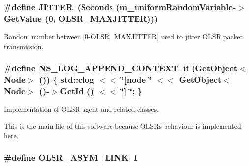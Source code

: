 \subsubsection[{\texorpdfstring{J\+I\+T\+T\+ER}{JITTER}}]{\setlength{\rightskip}{0pt plus 5cm}\#define J\+I\+T\+T\+ER~(Seconds (m\+\_\+uniform\+Random\+Variable-\/$>$Get\+Value (0, {\bf O\+L\+S\+R\+\_\+\+M\+A\+X\+J\+I\+T\+T\+ER})))}\hypertarget{olsr-routing-protocol_8cc_a06863e04dddc5f7fbbedb516974df4b3}{}\label{olsr-routing-protocol_8cc_a06863e04dddc5f7fbbedb516974df4b3}


Random number between \mbox{[}0-\/\+O\+L\+S\+R\+\_\+\+M\+A\+X\+J\+I\+T\+T\+ER\mbox{]} used to jitter O\+L\+SR packet transmission. 

\subsubsection[{\texorpdfstring{N\+S\+\_\+\+L\+O\+G\+\_\+\+A\+P\+P\+E\+N\+D\+\_\+\+C\+O\+N\+T\+E\+XT}{NS_LOG_APPEND_CONTEXT}}]{\setlength{\rightskip}{0pt plus 5cm}\#define N\+S\+\_\+\+L\+O\+G\+\_\+\+A\+P\+P\+E\+N\+D\+\_\+\+C\+O\+N\+T\+E\+XT~{\bf if} (Get\+Object$<$Node$>$ ()) \{ std\+::clog $<$$<$ \char`\"{}\mbox{[}node \char`\"{} $<$$<$ Get\+Object$<$Node$>$ ()-\/$>$Get\+Id () $<$$<$ \char`\"{}\mbox{]} \char`\"{}; \}}\hypertarget{olsr-routing-protocol_8cc_abe50035652d407c40bdaef78214c4955}{}\label{olsr-routing-protocol_8cc_abe50035652d407c40bdaef78214c4955}


Implementation of O\+L\+SR agent and related classes. 

This is the main file of this software because O\+L\+SR\textquotesingle{}s behaviour is implemented here. 
\subsubsection[{\texorpdfstring{O\+L\+S\+R\+\_\+\+A\+S\+Y\+M\+\_\+\+L\+I\+NK}{OLSR_ASYM_LINK}}]{\setlength{\rightskip}{0pt plus 5cm}\#define O\+L\+S\+R\+\_\+\+A\+S\+Y\+M\+\_\+\+L\+I\+NK~1}\hypertarget{olsr-routing-protocol_8cc_a8ebf1daea9834b2e4dfb42ca05b05f4a}{}\label{olsr-routing-protocol_8cc_a8ebf1daea9834b2e4dfb42ca05b05f4a}


